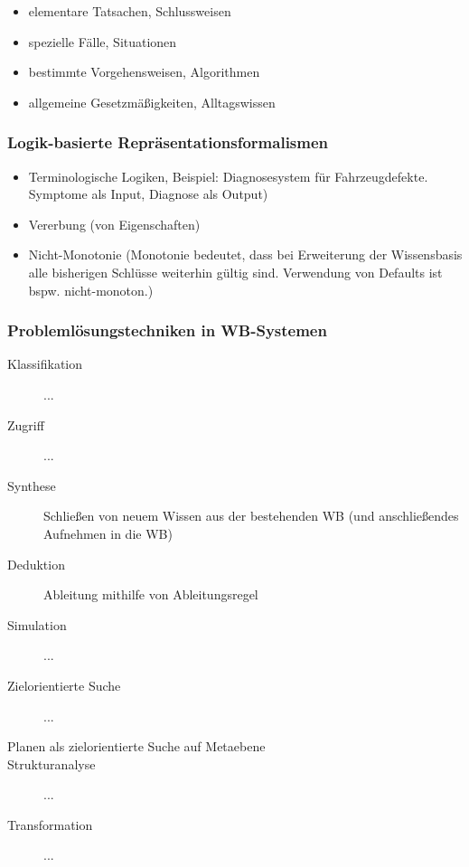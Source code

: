 \documentclass[runningheads,deutsch]{llncs}
\begin{document}
\begin{itemize}
    \item elementare Tatsachen, Schlussweisen
    \item spezielle Fälle, Situationen
    \item bestimmte Vorgehensweisen, Algorithmen
    \item allgemeine Gesetzmäßigkeiten, Alltagswissen
\end{itemize}

\subsubsection{Logik-basierte Repräsentationsformalismen}
\begin{itemize}
    \item Terminologische Logiken, Beispiel: Diagnosesystem für Fahrzeugdefekte. Symptome als Input, Diagnose als Output)
    \item Vererbung (von Eigenschaften)
    \item Nicht-Monotonie (Monotonie bedeutet, dass bei Erweiterung der Wissensbasis alle bisherigen Schlüsse weiterhin gültig sind. Verwendung von Defaults ist bspw. nicht-monoton.)
\end{itemize}

\subsubsection{Problemlösungstechniken in WB-Systemen}

\begin{description}
    \item[Klassifikation] ...
    \item[Zugriff] ...
    \item[Synthese] Schließen von neuem Wissen aus der bestehenden WB (und anschließendes Aufnehmen in die WB)
    \item[Deduktion] Ableitung mithilfe von Ableitungsregel
    \item[Simulation] ...
    \item[Zielorientierte Suche] ...
    \item[Planen als zielorientierte Suche auf Metaebene] 
    \item[Strukturanalyse] ...
    \item[Transformation] ...
\end{description}
\end{document}
